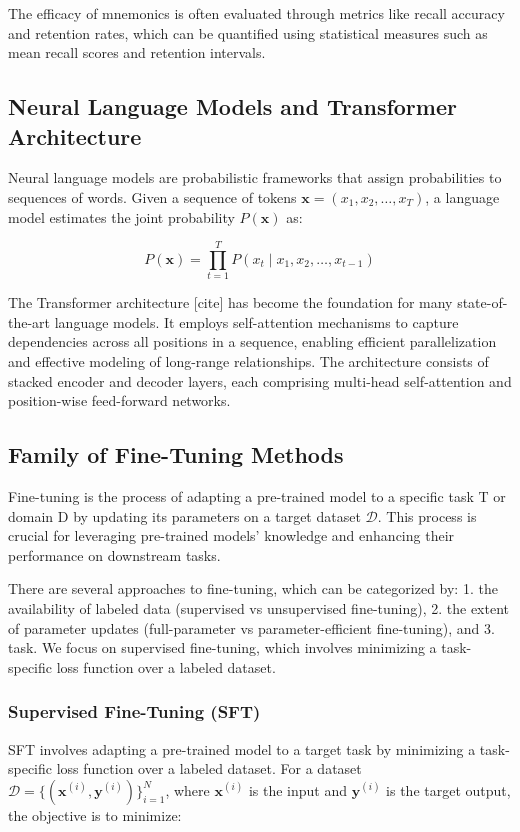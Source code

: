 \documentclass[11pt, onecolumn]{article}
\newcounter{para}
\begin{document}
The efficacy of mnemonics is often evaluated through metrics like recall accuracy and retention rates, which can be quantified using statistical measures such as mean recall scores and retention intervals.

\subsection{Neural Language Models and Transformer Architecture}

Neural language models are probabilistic frameworks that assign probabilities to sequences of words. Given a sequence of tokens \( \mathbf{x} = (x_1, x_2, \ldots, x_T) \), a language model estimates the joint probability \( P(\mathbf{x}) \) as:

\[
P(\mathbf{x}) = \prod_{t=1}^T P(x_t \mid x_1, x_2, \ldots, x_{t-1})
\]

The Transformer architecture [cite] has become the foundation for many state-of-the-art language models. It employs self-attention mechanisms to capture dependencies across all positions in a sequence, enabling efficient parallelization and effective modeling of long-range relationships. The architecture consists of stacked encoder and decoder layers, each comprising multi-head self-attention and position-wise feed-forward networks.

\subsection{Family of Fine-Tuning Methods}
Fine-tuning is the process of adapting a pre-trained model to a specific task T or domain D by updating its parameters on a target dataset \(\mathcal{D}\). This process is crucial for leveraging pre-trained models' knowledge and enhancing their performance on downstream tasks.

There are several approaches to fine-tuning, which can be categorized by: 1. the availability of labeled data (supervised vs unsupervised fine-tuning), 2. the extent of parameter updates (full-parameter vs parameter-efficient fine-tuning), and 3. task. We focus on supervised fine-tuning, which involves minimizing a task-specific loss function over a labeled dataset.

\subsubsection{Supervised Fine-Tuning (SFT)}\label{sec:sft}

SFT involves adapting a pre-trained model to a target task by minimizing a task-specific loss function over a labeled dataset. For a dataset \( \mathcal{D} = \{(\mathbf{x}^{(i)}, \mathbf{y}^{(i)})\}_{i=1}^N \), where \( \mathbf{x}^{(i)} \) is the input and \( \mathbf{y}^{(i)} \) is the target output, the objective is to minimize:
\end{document}
